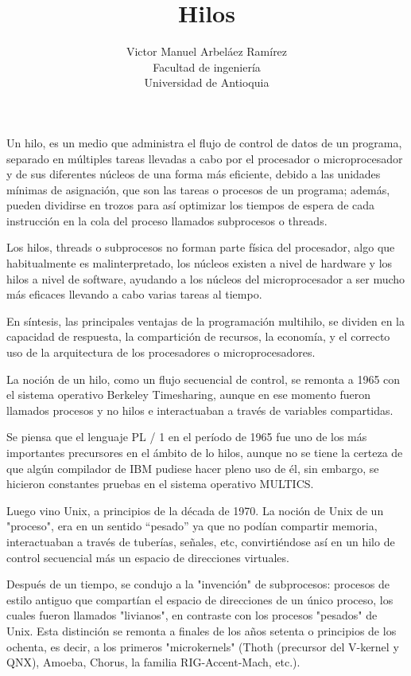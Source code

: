 \documentclass[12pt, letter]{article}
\title{\huge{Hilos}}
\author{Victor Manuel Arbeláez Ramírez \\ Facultad de ingeniería \\ Universidad de Antioquia}
\date{}
\begin{document}
\raggedright

\maketitle

\setlength{\parindent}{31pt}
Un hilo, es un medio que administra el flujo de control de datos de un programa, separado en múltiples tareas llevadas a cabo por el procesador o microprocesador y de sus diferentes núcleos de una forma más eficiente, debido a las unidades mínimas de asignación, que son las tareas o procesos de un programa; además, pueden dividirse en trozos para así optimizar los tiempos de espera de cada instrucción en la cola del proceso llamados subprocesos o threads.

\setlength{\parindent}{31pt}
Los hilos, threads o subprocesos no forman parte física del procesador, algo que habitualmente es malinterpretado, los núcleos existen a nivel de hardware y los hilos a nivel de software, ayudando a los núcleos del microprocesador a ser mucho más eficaces llevando a cabo varias tareas al tiempo.

\setlength{\parindent}{31pt}
En síntesis, las principales ventajas de la programación multihilo, se dividen en la capacidad de respuesta, la compartición de recursos, la economía, y el correcto uso de la arquitectura de los procesadores o microprocesadores.

\setlength{\parindent}{31pt}
La noción de un hilo, como un flujo secuencial de control, se remonta a 1965 con el sistema operativo Berkeley Timesharing, aunque en ese momento fueron llamados procesos y no hilos e interactuaban a través de variables compartidas.

\setlength{\parindent}{31pt}
Se piensa que el lenguaje PL / 1 en el período de 1965 fue uno de los más importantes precursores en el ámbito de lo hilos, aunque no se tiene la certeza de que algún compilador de IBM pudiese hacer pleno uso de él, sin embargo, se hicieron constantes pruebas en el sistema operativo MULTICS.

\setlength{\parindent}{31pt}
Luego vino Unix, a principios de la década de 1970. La noción de Unix de un "proceso", era en un sentido “pesado” ya que no podían compartir memoria, interactuaban a través de tuberías, señales, etc, convirtiéndose así en un hilo de control secuencial más un espacio de direcciones virtuales. 

\setlength{\parindent}{31pt}
Después de un tiempo, se condujo a la "invención" de subprocesos: procesos de estilo antiguo que compartían el espacio de direcciones de un único proceso, los cuales fueron llamados "livianos", en contraste con los procesos "pesados" de Unix. Esta distinción se remonta a finales de los años setenta o principios de los ochenta, es decir, a los primeros "microkernels" (Thoth (precursor del V-kernel y QNX), Amoeba, Chorus, la familia RIG-Accent-Mach, etc.). 
\end{document}
